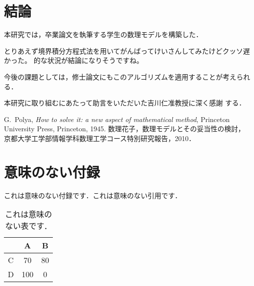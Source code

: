 \documentclass[dvipdfmx]{ampbt}
\def\numberofspines{1}
\begin{document}
\section{結論}
本研究では，卒業論文を執筆する学生の数理モデルを構築した．

とりあえず境界積分方程式法を用いてがんばってけいさんしてみたけどクッソ遅かった。
的な状況が結論になりそうですね。

今後の課題としては，修士論文にもこのアルゴリズムを適用することが考えられる．

\acknowledgment
本研究に取り組むにあたって助言をいただいた吉川仁准教授に深く感謝
する．

\begin{thebibliography}{10}
  G.~Polya, \textit{How to solve it: a new aspect of mathematical method},
  Princeton University Press, Princeton, 1945.
  数理花子，数理モデルとその妥当性の検討，
  京都大学工学部情報学科数理工学コース特別研究報告，2010．
\end{thebibliography}

\appendix

\section{意味のない付録}
これは意味のない付録です．これは意味のない引用です\cite{polya1945}．

\begin{table}[htbp]
  \caption{これは意味のない表です．}
  \centering
  \begin{tabular}{c|cc}
      &  A  &  B \\
    \hline
    C &  70 & 80 \\
    D & 100 &  0
  \end{tabular}
\end{table}

\fi
\ifoutputcover
\cleardoublepage
\makecover                      %
\makespine[\numberofspines]     %
\fi
\ifoutputabstractforsubmission
\makeabstractforsubmission      %
\fi
\end{document}
